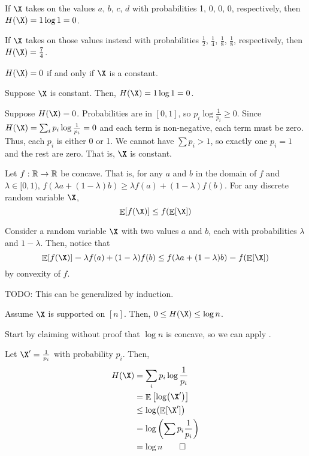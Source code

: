 \documentclass[class=co432,notes,tikz]{agony}
\DeclareMathOperator*{\E}{\mathbb{E}}
\begin{document}
\begin{example}
  If $\X$ takes on the values $a$, $b$, $c$, $d$
  with probabilities 1, 0, 0, 0, respectively, then $H(\X) = 1 \log 1 = 0$.

  If $\X$ takes on those values instead with probabilities
  $\frac12$, $\frac14$, $\frac18$, $\frac18$, respectively,
  then $H(\X) = \frac74$.
\end{example}

\begin{fact}
  $H(\X) = 0$ if and only if $\X$ is a constant.
\end{fact}
\begin{prf}
  Suppose $\X$ is constant. Then, $H(\X) = 1 \log 1 = 0$.

  Suppose $H(\X) = 0$.
  Probabilities are in $[0,1]$, so $p_i \log \frac{1}{p_i} \geq 0$.
  Since $H(\X) = \sum_i p_i \log \frac{1}{p_i} = 0$
  and each term is non-negative, each term must be zero.
  Thus, each $p_i$ is either 0 or 1.
  We cannot have $\sum p_i > 1$, so exactly one $p_i = 1$ and the rest are zero.
  That is, $\X$ is constant.
\end{prf}

\begin{theorem}\label{thm:jensen}
  Let $f : \mathbb{R} \to \mathbb{R}$ be concave. That is,
  for any $a$ and $b$ in the domain of $f$ and $\lambda \in [0,1)$,
  $f(\lambda a + (1-\lambda)b) \geq \lambda f(a) + (1-\lambda)f(b)$.
  For any discrete random variable $\X$,
  \[ \E[f(\X)] \leq f(\E[\X]) \]
\end{theorem}
\begin{prf}
  Consider a random variable $\X$ with two values $a$ and $b$,
  each with probabilities $\lambda$ and $1-\lambda$.
  Then, notice that
  \[ \E[f(\X)] = \lambda f(a) + (1-\lambda) f(b) \leq f(\lambda a + (1-\lambda)b) = f(\E[\X]) \]
  by convexity of $f$.

  TODO: This can be generalized by induction.
\end{prf}

\begin{fact}
  Assume $\X$ is supported on $[n]$. Then, $0 \leq H(\X) \leq \log n$.
\end{fact}
\begin{prf}
  Start by claiming without proof that $\log n$ is concave, so we can apply
  .

  Let $\X' = \frac{1}{p_i}$ with probability $p_i$. Then,
  \begin{align*}
    H(\X) & = \sum_i p_i \log \frac{1}{p_i}    \\
          & = \E\qty[\log(\X')]                \\
          & \leq \log(\E[\X'])                 \\
          & = \log\qty(\sum p_i \frac{1}{p_i}) \\
          & = \log n \qedhere
  \end{align*}
\end{prf}
\end{document}
